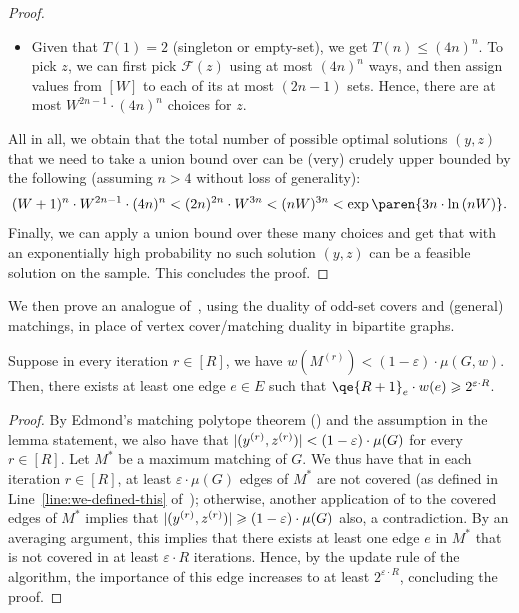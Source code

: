 \documentclass{article}
\renewcommand{\leq}{\leqslant}
\renewcommand{\geq}{\geqslant}
\DeclarePairedDelimiter{\paren}()
\DeclarePairedDelimiter{\card}{\vert}{\vert}
\newcommand{\eps}{\varepsilon}
\begin{document}
\begin{proof}
\begin{itemize}[leftmargin=10pt]
\begin{itemize}
			place it anywhere. 
			This leads to $<4n$ options times $T(n-1)$, establishing the claim. 
			\item Given that $T(1) = 2$ (singleton or empty-set), we get $T(n) \leq (4n)^n$. To pick $z$, we can first pick $\mathcal{F}(z)$ using at most $(4n)^n$ ways, and then assign values from $[W]$ to each of its at most $(2n-1)$ sets. Hence,
			there are at most $W^{2n-1} \cdot (4n)^n$ choices for $z$. 
		\end{itemize}
		\end{itemize}
		All in all, we obtain that the total number of possible optimal solutions $(y,z)$ that we need to take a union bound over can be (very) crudely upper bounded by the following (assuming $n > 4$ without loss of generality):   
		\[
			(W+1)^{n} \cdot W^{2n-1} \cdot (4n)^n < (2n)^{2n} \cdot W^{3n} < (nW)^{3n} < \exp\paren{3n \cdot \ln{(nW)}}. 
		\]
		Finally, we can  apply a union bound over these many choices and get that with an exponentially high probability no such solution $(y,z)$ can be a feasible solution on the sample. 
		This concludes the proof. 
\end{proof}
	
We then prove an analogue of~, using the duality of odd-set covers and (general) matchings, in place of vertex cover/matching duality in bipartite graphs. 

\begin{lemma}\label{lem:Qe-large-general}
	Suppose in every iteration $r \in [R]$, we have $w({M^{(r)}}) < (1-\eps) \cdot \mu(G,w)$. Then, 
	there exists at least one edge $e \in E$ such that $\qe{R+1}_e \cdot w(e)  \geq 2^{\eps \cdot R}$.  
\end{lemma}
\begin{proof}
	By Edmond's matching polytope theorem () and the assumption in the lemma statement, we also have that $\card{(y^{(r)},z^{(r)})} < (1-\eps) \cdot \mu(G)$ for every $r \in [R]$. Let $M^*$ be a maximum matching of $G$. 
	We thus have that in each iteration $r \in [R]$, at least $\eps \cdot \mu(G)$ edges of $M^*$ are not covered (as defined in Line~\eqref{line:we-defined-this} of~); otherwise, another application of   to 
	the covered edges of $M^*$ implies that $\card{(y^{(r)},z^{(r)})} \geq (1-\eps) \cdot \mu(G)$ also, a contradiction. By an averaging argument, this implies that there exists at least one edge $e$ in $M^*$ that is not
	covered in at least $\eps \cdot R$ iterations. Hence, by the update rule of the algorithm, the importance of this edge increases to at least $2^{\eps \cdot R}$, concluding the proof. 
\end{proof}
\end{document}
